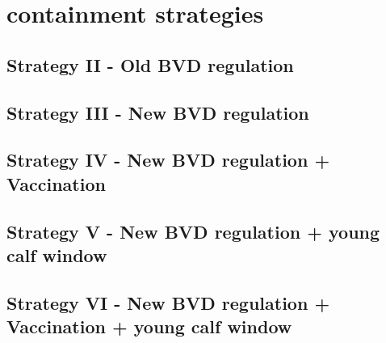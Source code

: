 \section{containment strategies}
\subsection{Strategy II - Old BVD regulation}
\subsection{Strategy III - New BVD regulation}
\subsection{Strategy IV - New BVD regulation + Vaccination}
\subsection{Strategy V - New BVD regulation + young calf window}
\subsection{Strategy VI - New BVD regulation + Vaccination + young calf window} 